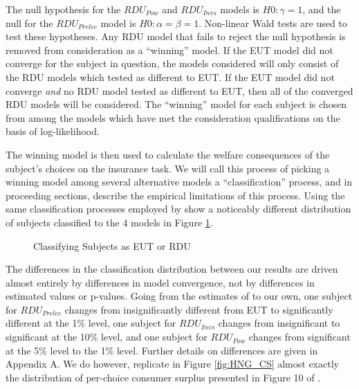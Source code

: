 \documentclass[../main.tex]{subfiles}
\begin{document}
The null hypothesis for the $\mathit{RDU_{Pow}}$ and $\mathit{RDU_{Invs}}$ models is $H0: \gamma = 1$, and the null for the $\mathit{RDU_{Prelec}}$ model is $H0: \alpha = \beta = 1$.
Non-linear Wald tests are used to test these hypotheses.
Any RDU model that fails to reject the null hypothesis is removed from consideration as a \enquote{winning} model.
If the EUT model did not converge for the subject in question, the models considered will only consist of the RDU models which tested as different to EUT.
If the EUT model did not converge \textit{and} no RDU model tested as different to EUT, then all of the converged RDU models will be considered.
The \enquote{winning} model for each subject is chosen from among the models which have met the consideration qualifications on the basis of log-likelihood.

The winning model is then used to calculate the welfare consequences of the subject's choices on the insurance task.
We will call this process of picking a winning model among several alternative models a \enquote{classification} process, and in proceeding sections, describe the empirical limitations of this process.
Using the same classification processes employed by \textcite{Harrison2016} show a noticeably different distribution of subjects classified to the 4 models in Figure \ref{fig:HNG_pvals}.

\begin{figure}[h!]
	\center
	\caption{Classifying Subjects as EUT or RDU}
	\label{fig:HNG_pvals}
\end{figure}

The differences in the classification distribution between our results are driven almost entirely by differences in model convergence, not by differences in estimated values or p-values.
Going from the estimates of \textcite{Harrison2016} to our own, one subject for $\mathit{RDU_{Prelec}}$ changes from insignificantly different from EUT to significantly different at the 1\% level, one subject for $\mathit{RDU_{Invs}}$ changes from insignificant to significant at the 10\% level, and one subject for $\mathit{RDU_{Pow}}$ changes from significant at the 5\% level to the 1\% level.
Further details on differences are given in Appendix A.
We do however, replicate in Figure \ref{fig:HNG_CS} almost exactly the distribution of per-choice consumer surplus presented in Figure 10 of \textcite[108]{Harrison2016}.
\end{document}
